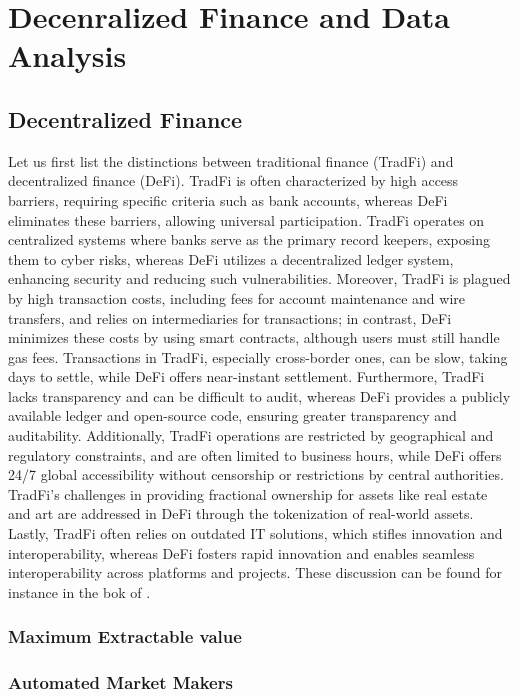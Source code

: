 \chapter{Decenralized Finance and Data Analysis}\label{chap:defi}

\section{Decentralized Finance}

Let us first list the distinctions between traditional finance (TradFi) and decentralized finance (DeFi). TradFi is often characterized by high access barriers, requiring specific criteria such as bank accounts, whereas DeFi eliminates these barriers, allowing universal participation. TradFi operates on centralized systems where banks serve as the primary record keepers, exposing them to cyber risks, whereas DeFi utilizes a decentralized ledger system, enhancing security and reducing such vulnerabilities. Moreover, TradFi is plagued by high transaction costs, including fees for account maintenance and wire transfers, and relies on intermediaries for transactions; in contrast, DeFi minimizes these costs by using smart contracts, although users must still handle gas fees. Transactions in TradFi, especially cross-border ones, can be slow, taking days to settle, while DeFi offers near-instant settlement. Furthermore, TradFi lacks transparency and can be difficult to audit, whereas DeFi provides a publicly available ledger and open-source code, ensuring greater transparency and auditability. Additionally, TradFi operations are restricted by geographical and regulatory constraints, and are often limited to business hours, while DeFi offers 24/7 global accessibility without censorship or restrictions by central authorities. TradFi's challenges in providing fractional ownership for assets like real estate and art are addressed in DeFi through the tokenization of real-world assets. Lastly, TradFi often relies on outdated IT solutions, which stifles innovation and interoperability, whereas DeFi fosters rapid innovation and enables seamless interoperability across platforms and projects. These discussion can be found for instance in the bok of \citet{Lipton2021}.
\subsection{Maximum Extractable value}
\subsection{Automated Market Makers}
